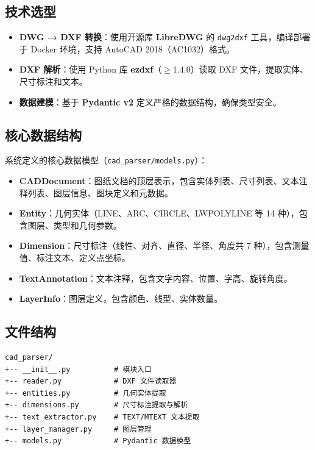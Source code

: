\documentclass[11pt,a4paper]{article}
\begin{document}
\subsection{技术选型}

\begin{itemize}[nosep]
  \item \textbf{DWG → DXF 转换}：使用开源库 \textbf{LibreDWG} 的 \texttt{dwg2dxf} 工具，编译部署于 Docker 环境，支持 AutoCAD 2018（AC1032）格式。
  \item \textbf{DXF 解析}：使用 Python 库 \textbf{ezdxf}（$\ge$1.4.0）读取 DXF 文件，提取实体、尺寸标注和文本。
  \item \textbf{数据建模}：基于 \textbf{Pydantic v2} 定义严格的数据结构，确保类型安全。
\end{itemize}

\subsection{核心数据结构}

系统定义的核心数据模型（\texttt{cad\_parser/models.py}）：

\begin{itemize}[nosep]
  \item \textbf{CADDocument}：图纸文档的顶层表示，包含实体列表、尺寸列表、文本注释列表、图层信息、图块定义和元数据。
  \item \textbf{Entity}：几何实体（LINE、ARC、CIRCLE、LWPOLYLINE 等 14 种），包含图层、类型和几何参数。
  \item \textbf{Dimension}：尺寸标注（线性、对齐、直径、半径、角度共 7 种），包含测量值、标注文本、定义点坐标。
  \item \textbf{TextAnnotation}：文本注释，包含文字内容、位置、字高、旋转角度。
  \item \textbf{LayerInfo}：图层定义，包含颜色、线型、实体数量。
\end{itemize}

\subsection{文件结构}

\begin{lstlisting}[language={},frame=single]
cad_parser/
+-- __init__.py          # 模块入口
+-- reader.py            # DXF 文件读取器
+-- entities.py          # 几何实体提取
+-- dimensions.py        # 尺寸标注提取与解析
+-- text_extractor.py    # TEXT/MTEXT 文本提取
+-- layer_manager.py     # 图层管理
+-- models.py            # Pydantic 数据模型
\end{lstlisting}
\end{document}

